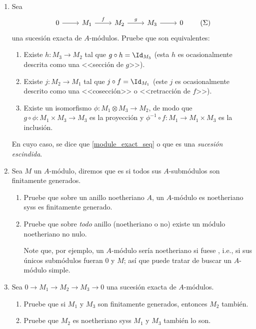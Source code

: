 \documentclass[11pt, reqno]{amsart}
\begin{document}
\begin{enumerate}
	\item Sea
		\begin{equation}
			\begin{tikzcd}
				0 \rar & M_1 \rar["f"] & M_2 \rar["g"] & M_3 \rar & 0
			\end{tikzcd}
			\tag{$\Sigma$}
			\label{module_exact_seq}
		\end{equation}
		una sucesión exacta de $A$-módulos.
		Pruebe que son equivalentes:
		\begin{enumerate}
			\item Existe $h \colon M_3 \to M_2$ tal que $g\circ h = \Id_{M_3}$
				(esta $h$ es ocasionalmente descrita como una <<sección de $g$>>).
			\item Existe $j \colon M_2 \to M_1$ tal que $j\circ f = \Id_{M_1}$
				(este $j$ es ocasionalmente descrito como una <<cosección>> o <<retracción de $f$>>).
			\item Existe un isomorfismo $\phi\colon M_1\otimes M_3 \to M_2$, de modo que $g\circ\phi \colon
				M_1\times M_3 \to M_3$ es la proyección y $\phi^{-1}\circ f \colon M_1 \to M_1\times
				M_3$ es la inclusión. 
		\end{enumerate}
		En cuyo caso, se dice que \eqref{module_exact_seq}  o que es una \emph{sucesión
		escindida}.
		
	\item Sea $M$ un $A$-módulo, diremos que es  si todos sus $A$-submódulos son finitamente generados.
		\begin{enumerate}
			\item\label{ex:noetherian_modules}
				Pruebe que sobre un anillo noetheriano $A$, un $A$-módulo es noetheriano syss es finitamente generado.
			\item\lookup
				Pruebe que sobre \emph{todo} anillo (noetheriano o no) existe un módulo noetheriano no nulo.
				\begin{hint}
					Note que, por ejemplo, un $A$-módulo sería noetheriano si fuese ,
					i.e., si sus únicos submódulos fueran $0$ y $M$; así que puede tratar de buscar
					un $A$-módulo simple.
				\end{hint}
		\end{enumerate}

	\item Sea $0 \to M_1 \to M_2 \to M_3 \to 0$ una sucesión exacta de $A$-módulos.
		\begin{enumerate}
			\item Pruebe que si $M_1$ y $M_3$ son finitamente generados, entonces $M_2$ también.
			\item Pruebe que $M_2$ es noetheriano syss $M_1$ y $M_3$ también lo son.
		\end{enumerate}
\end{enumerate}
\end{document}

